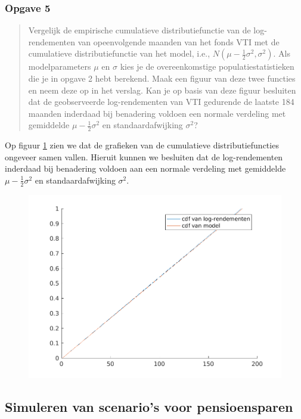\documentclass[11pt, a4paper, titlepage, openright]{article}
\begin{document}
	\subsubsection{Opgave 5}
		\begin{quote}
			Vergelijk de empirische cumulatieve distributiefunctie van de log-rendementen van opeenvolgende maanden
			van het fonds VTI met de cumulatieve distributiefunctie van het model, i.e., 
			\( N(\mu - \frac{1}{2} \sigma^{2}, \sigma^{2}) \). Als modelparameters \( \mu \) en \( \sigma \) 
			kies je de overeenkomstige populatiestatistieken die je in opgave 2 hebt berekend. Maak een figuur
			van deze twee functies en neem deze op in het verslag. Kan je op basis van deze figuur besluiten 
			dat de geobserveerde log-rendementen van VTI gedurende de laatste 184 maanden inderdaad bij 
			benadering voldoen een normale verdeling met gemiddelde \( \mu - \frac{1}{2} \sigma^{2} \) en standaardafwijking \( \sigma^{2} \)?
		\end{quote}
		
		\noindent Op figuur \ref{fig:ex5} zien we dat de grafieken van de cumulatieve distributiefuncties ongeveer samen vallen.
		Hieruit kunnen we besluiten dat de log-rendementen inderdaad bij benadering voldoen aan 
		een normale verdeling met gemiddelde \( \mu - \frac{1}{2} \sigma^{2} \) en standaardafwijking \( \sigma^{2} \).
		
		\begin{figure}[H]
			\centering
			\includegraphics[width=0.7\linewidth]{../ex5}
			\caption{}
			\label{fig:ex5}
		\end{figure}
	
	
	
	\subsection{Simuleren van scenario's voor pensioensparen}
	
\end{document}
